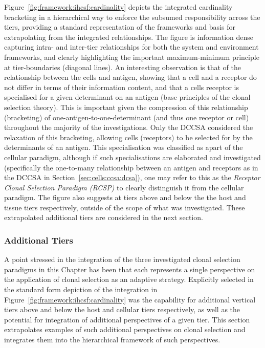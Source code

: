 Figure~\ref{fig:framework:ihcsf:cardinality} depicts the integrated cardinality bracketing in a hierarchical way to enforce the subsumed responsibility across the tiers, providing a standard representation of the frameworks and basis for extrapolating from the integrated relationships. The figure is information dense capturing intra- and inter-tier relationships for both the system and environment frameworks, and clearly highlighting the important maximum-minimum principle at tier-boundaries (diagonal lines). 
An interesting observation is that of the relationship between the cells and antigen, showing that a cell and a receptor do not differ in terms of their information content, and that a cells receptor is specialised for a given determinant on an antigen (base principles of the clonal selection theory). This is important given the compression of this relationship (bracketing) of one-antigen-to-one-determinant (and thus one receptor or cell) throughout the majority of the investigations. Only the DCCSA considered the relaxation of this bracketing, allowing cells (receptors) to be selected for by the determinants of an antigen. This specialisation was classified as apart of the cellular paradigm, although if such specialisations are elaborated and investigated (specifically the one-to-many relationship between an antigen and receptors as in the DCCSA in Section~\ref{sec:cells:ccsa:dcsa}), one may refer to this as the \emph{Receptor Clonal Selection Paradigm (RCSP)} to clearly distinguish it from the cellular paradigm.
The figure also suggests at tiers above and below the the host and tissue tiers respectively, outside of the scope of what was investigated. These extrapolated additional tiers are considered in the next section.


%
%
\subsubsection{Additional Tiers}
\label{subsec:framework:ihcsf:bracketing:additionaltiers}
A point stressed in the integration of the three investigated clonal selection paradigms in this Chapter has been that each represents a single perspective on the application of clonal selection as an adaptive strategy. Explicitly selected in the standard form depiction of the integration in Figure~\ref{fig:framework:ihcsf:cardinality} was the capability for additional vertical tiers above and below the host and cellular tiers respectively, as well as the potential for integration of additional perspectives of a given tier. This section extrapolates examples of such additional perspectives on clonal selection and integrates them into the hierarchical framework of such perspectives.

